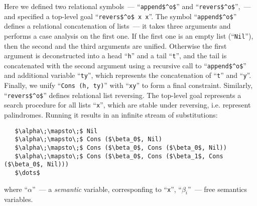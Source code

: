 Here we defined two relational symbols~--- ``\lstinline|append$^o$|'' and ``\lstinline|revers$^o$|'',~--- and specified a top-level goal ``\lstinline|revers$^o$ x x|''.
The symbol ``\lstinline|append$^o$|'' defines a relational concatenation of lists~--- it takes three arguments and performs a case analysis on the first one. If the
first one is an empty list (``\lstinline|Nil|''), then the second and the third arguments are unified. Otherwise the first argument is deconstructed into a head ``\lstinline|h|''
and a tail ``\lstinline|t|'', and the tail is concatenated with the second argument using a recursive call to ``\lstinline|append$^o$|'' and additional variable ``\lstinline|ty|'', which
represents the concatenation of ``\lstinline|t|'' and ``\lstinline|y|''. Finally, we unify ``\lstinline|Cons (h, ty)|'' with ``\lstinline|xy|'' to form a final constraint. Similarly,
``\lstinline|revers$^o$|'' defines relational list reversing. The top-level goal represents a search procedure for all lists ``\lstinline|x|'', which are stable under reversing, i.e.
represent palindromes. Running it results in an infinite stream of substitutions:

\begin{lstlisting}
   $\alpha\;\mapsto\;$ Nil
   $\alpha\;\mapsto\;$ Cons ($\beta_0$, Nil)
   $\alpha\;\mapsto\;$ Cons ($\beta_0$, Cons ($\beta_0$, Nil))
   $\alpha\;\mapsto\;$ Cons ($\beta_0$, Cons ($\beta_1$, Cons ($\beta_0$, Nil)))
   $\dots$
\end{lstlisting}

where ``$\alpha$''~--- a \emph{semantic} variable, corresponfing to ``\lstinline|x|'', ``$\beta_i$''~--- free semantics variables.

